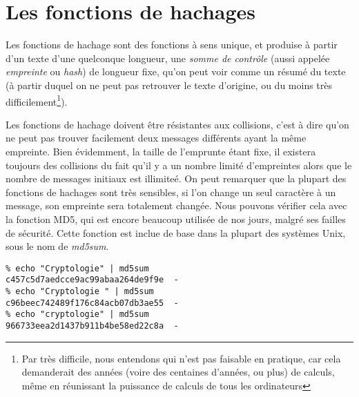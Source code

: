 \section{Les fonctions de hachages\label{sec:FonctionHachage}}
Les fonctions de hachage sont des fonctions à sens unique, et
produise à partir d'un texte d'une quelconque longueur, une 
\emph{somme de contrôle} (aussi appelée \emph{empreinte}
ou \emph{hash}) de longueur fixe, qu'on peut voir comme un résumé
du texte (à partir duquel on ne peut pas retrouver le texte
d'origine, ou du moins très difficilement\footnote{Par très
difficile, nous entendons qui n'est pas faisable en pratique, car
cela demanderait des années (voire des centaines d'années, ou
plus) de calculs, même en réunissant la puissance de calculs de
tous les ordinateurs}).

Les fonctions de hachage doivent être résistantes aux collisions,
c'est à dire qu'on ne peut pas trouver facilement deux messages
différents ayant la même empreinte. Bien évidemment, la taille de
l'emprunte étant fixe, il existera toujours des collisions du fait
qu'il y a un nombre limité d'empreintes alors que le nombre de
messages initiaux est illimiteé.
On peut remarquer que la plupart des fonctions de hachages sont
très sensibles, si l'on change un seul caractère à un message, son
empreinte sera totalement changée. Nous pouvons vérifier cela avec
la fonction MD5, qui est encore beaucoup utilisée de nos jours,
malgré ses failles de sécurité. Cette fonction est inclue de base
dans la plupart des systèmes Unix, sous le nom de \emph{md5sum}.

\lstset{language=bash}
\begin{lstlisting}
% echo "Cryptologie" | md5sum
c457c5d7aedcce9ac99abaa264de9f9e  -
% echo "Cryptologie " | md5sum
c96beec742489f176c84acb07db3ae55  -
% echo "cryptologie" | md5sum
966733eea2d1437b911b4be58ed22c8a  -
\end{lstlisting}


